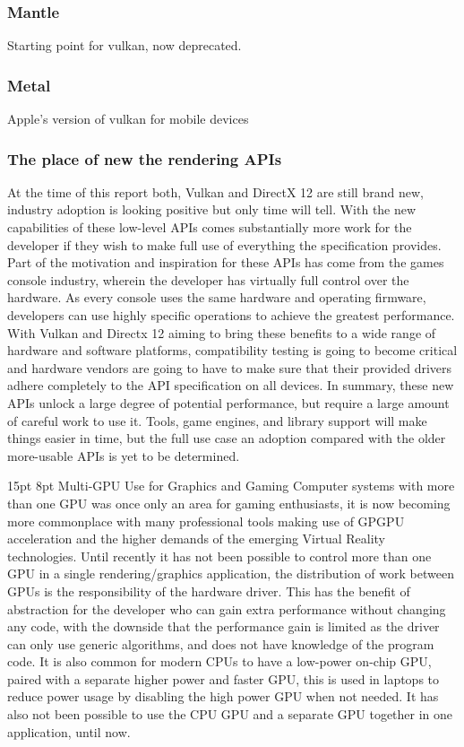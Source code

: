 \documentclass[12pt,a4paper]{article}
\makeatletter
\renewcommand\subsection{\@startsection {subsection}{1}{2mm} %
                               {15pt} %
                               {8pt} %
                               {\fontsize{13pt}{1em}\bfseries}}
\makeatother
\begin{document}
\subsubsection{Mantle}
Starting point for vulkan, now deprecated.

\subsubsection{Metal}
Apple’s version of vulkan for mobile devices

\subsubsection{The place of new the rendering APIs }
At the time of this report both, Vulkan and DirectX 12 are still brand new, industry adoption is looking positive but only time will tell. With the new capabilities of these low-level APIs comes substantially more work for the developer if they wish to make full use of everything the specification provides. Part of the motivation and inspiration for these APIs has come from the games console industry, wherein the developer has virtually full control over the hardware. As every console uses the same hardware and operating firmware, developers can use highly specific operations to achieve the greatest performance. With Vulkan and Directx 12 aiming to bring these benefits to a wide range of hardware and software platforms, compatibility testing is going to become critical and hardware vendors are going to have to make sure that their provided drivers adhere completely to the API specification on all devices. In summary, these new APIs unlock a large degree of potential performance, but require a large amount of careful work to use it. Tools, game engines, and library support will make things easier in time, but the full use case an adoption compared with the older more-usable APIs is yet to be determined. 

\subsection{Multi-GPU Use for Graphics and Gaming}
Computer systems with more than one GPU was once only an area for gaming enthusiasts, it is now becoming more commonplace with many professional tools making use of GPGPU acceleration and the higher demands of the emerging Virtual Reality technologies.  Until recently it has not been possible to control more than one GPU in a single rendering/graphics application, the distribution of work between GPUs is the responsibility of the hardware driver. This has the benefit of abstraction for the developer who can gain extra performance without changing any code, with the downside that the performance gain is limited as the driver can only use generic algorithms, and does not have knowledge of the program code.
It is also common for modern CPUs to have a low-power on-chip GPU, paired with a separate higher power and faster GPU, this is used in laptops to reduce power usage by disabling the high power GPU when not needed.
It has also not been possible to use the CPU GPU and a separate GPU together in one application, until now.
\end{document}
